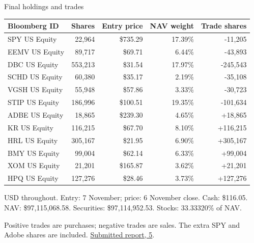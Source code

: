 \documentclass[aspectratio=169,11pt,t]{beamer}
\newcommand{\source}[1]{\par\vfill{\fontsize{6.3}{8}\selectfont\color{muted}#1\par}}
\newcommand{\reportsection}[1]{\href{https://kybeka.github.io/meridian-capital/materials/round-2-report.pdf}{Submitted report, #1}}
\newcommand{\smallnote}[1]{{\fontsize{8}{10}\selectfont\color{muted}#1}}
\begin{document}
\appendix
{}

\begin{frame}{Final holdings and trades}

\fontsize{8}{10.2}\selectfont
\begin{tabularx}{\textwidth}{@{}Xrrrr@{}}\toprule
Bloomberg ID & Shares & Entry price & NAV weight & Trade shares\\\midrule
SPY US Equity & 22,964 & \$735.29 & 17.39\% & -11,205\\
EEMV US Equity & 89,717 & \$69.71 & 6.44\% & -43,893\\
DBC US Equity & 553,213 & \$31.54 & 17.97\% & -245,543\\
SCHD US Equity & 60,380 & \$35.17 & 2.19\% & -35,108\\
VGSH US Equity & 55,948 & \$57.86 & 3.33\% & -30,723\\
STIP US Equity & 186,996 & \$100.51 & 19.35\% & -101,634\\
ADBE US Equity & 18,865 & \$239.30 & 4.65\% & +18,865\\
KR US Equity & 116,215 & \$67.70 & 8.10\% & +116,215\\
HRL US Equity & 305,167 & \$21.95 & 6.90\% & +305,167\\
BMY US Equity & 99,004 & \$62.14 & 6.33\% & +99,004\\
XOM US Equity & 21,201 & \$165.87 & 3.62\% & +21,201\\
HPQ US Equity & 127,276 & \$28.46 & 3.73\% & +127,276\\
\bottomrule\end{tabularx}\par\vspace{.18cm}
\smallnote{USD throughout. Entry: 7 November; price: 6 November close. Cash: \$116.05. NAV: \$97,115,068.58. Securities: \$97,114,952.53. Stocks: 33.33320\% of NAV.}
\source{Positive trades are purchases; negative trades are sales. The extra SPY and Adobe shares are included. \reportsection{5}.}

\end{frame}
\end{document}
